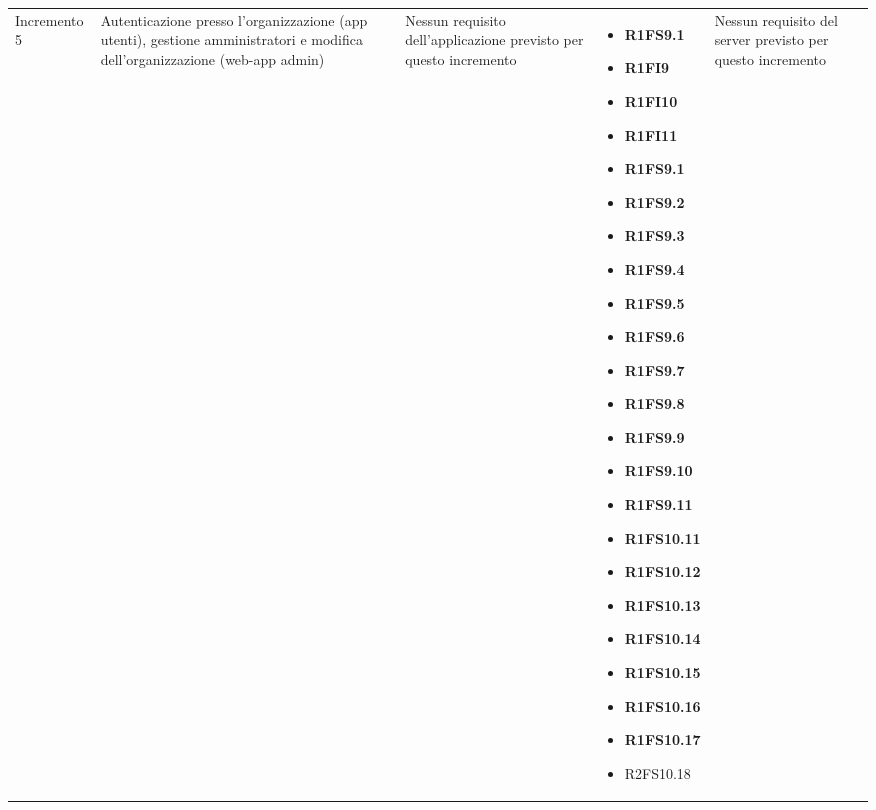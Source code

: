 {\begin{longtable}{C{2.5cm} C{3.2cm} C{2.8cm} C{2.8cm} C{2.8cm}}
Incremento 5 & Autenticazione presso l'organizzazione (app utenti), gestione amministratori  e modifica dell'organizzazione (web-app admin) &
    Nessun requisito dell'applicazione previsto per questo incremento
    & \begin{itemize} 
    \item[ ] \textbf{R1FS9.1}
    \item[ ] \textbf{R1FI9}
    \item[ ] \textbf{R1FI10}
    \item[ ] \textbf{R1FI11}
    \item[ ] \textbf{R1FS9.1}
    \item[ ] \textbf{R1FS9.2}
    \item[ ] \textbf{R1FS9.3}
    \item[ ] \textbf{R1FS9.4}
    \item[ ] \textbf{R1FS9.5}
    \item[ ] \textbf{R1FS9.6}
    \item[ ] \textbf{R1FS9.7}
    \item[ ] \textbf{R1FS9.8}
    \item[ ] \textbf{R1FS9.9}
    \item[ ] \textbf{R1FS9.10}
    \item[ ] \textbf{R1FS9.11}
    \item[ ] \textbf{R1FS10.11}
    \item[ ] \textbf{R1FS10.12}
    \item[ ] \textbf{R1FS10.13}
    \item[ ] \textbf{R1FS10.14}
    \item[ ] \textbf{R1FS10.15}
    \item[ ] \textbf{R1FS10.16}
    \item[ ] \textbf{R1FS10.17}
    \item[ ] R2FS10.18
\end{itemize} &
    Nessun requisito del server previsto per questo incremento \\


\end{longtable}}
